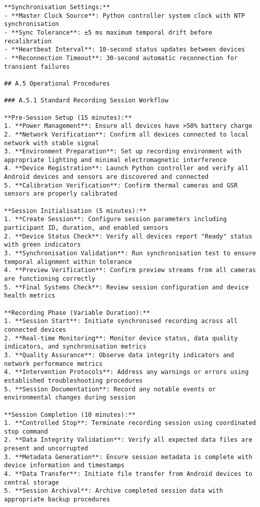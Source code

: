 \begin{verbatim}
**Synchronisation Settings:**
- **Master Clock Source**: Python controller system clock with NTP synchronisation
- **Sync Tolerance**: ±5 ms maximum temporal drift before recalibration
- **Heartbeat Interval**: 10-second status updates between devices
- **Reconnection Timeout**: 30-second automatic reconnection for transient failures

## A.5 Operational Procedures

### A.5.1 Standard Recording Session Workflow

**Pre-Session Setup (15 minutes):**
1. **Power Management**: Ensure all devices have >50% battery charge
2. **Network Verification**: Confirm all devices connected to local network with stable signal
3. **Environment Preparation**: Set up recording environment with appropriate lighting and minimal electromagnetic interference
4. **Device Registration**: Launch Python controller and verify all Android devices and sensors are discovered and connected
5. **Calibration Verification**: Confirm thermal cameras and GSR sensors are properly calibrated

**Session Initialisation (5 minutes):**
1. **Create Session**: Configure session parameters including participant ID, duration, and enabled sensors
2. **Device Status Check**: Verify all devices report "Ready" status with green indicators
3. **Synchronisation Validation**: Run synchronisation test to ensure temporal alignment within tolerance
4. **Preview Verification**: Confirm preview streams from all cameras are functioning correctly
5. **Final Systems Check**: Review session configuration and device health metrics

**Recording Phase (Variable Duration):**
1. **Session Start**: Initiate synchronised recording across all connected devices
2. **Real-time Monitoring**: Monitor device status, data quality indicators, and synchronisation metrics
3. **Quality Assurance**: Observe data integrity indicators and network performance metrics
4. **Intervention Protocols**: Address any warnings or errors using established troubleshooting procedures
5. **Session Documentation**: Record any notable events or environmental changes during session

**Session Completion (10 minutes):**
1. **Controlled Stop**: Terminate recording session using coordinated stop command
2. **Data Integrity Validation**: Verify all expected data files are present and uncorrupted
3. **Metadata Generation**: Ensure session metadata is complete with device information and timestamps
4. **Data Transfer**: Initiate file transfer from Android devices to central storage
5. **Session Archival**: Archive completed session data with appropriate backup procedures


\end{verbatim}
